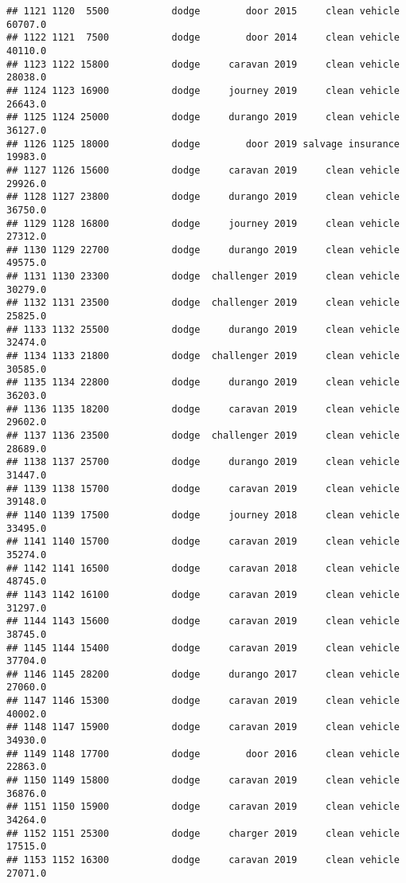 \documentclass[
]{article}
\begin{document}
\begin{verbatim}
## 1121 1120  5500           dodge        door 2015     clean vehicle   60707.0
## 1122 1121  7500           dodge        door 2014     clean vehicle   40110.0
## 1123 1122 15800           dodge     caravan 2019     clean vehicle   28038.0
## 1124 1123 16900           dodge     journey 2019     clean vehicle   26643.0
## 1125 1124 25000           dodge     durango 2019     clean vehicle   36127.0
## 1126 1125 18000           dodge        door 2019 salvage insurance   19983.0
## 1127 1126 15600           dodge     caravan 2019     clean vehicle   29926.0
## 1128 1127 23800           dodge     durango 2019     clean vehicle   36750.0
## 1129 1128 16800           dodge     journey 2019     clean vehicle   27312.0
## 1130 1129 22700           dodge     durango 2019     clean vehicle   49575.0
## 1131 1130 23300           dodge  challenger 2019     clean vehicle   30279.0
## 1132 1131 23500           dodge  challenger 2019     clean vehicle   25825.0
## 1133 1132 25500           dodge     durango 2019     clean vehicle   32474.0
## 1134 1133 21800           dodge  challenger 2019     clean vehicle   30585.0
## 1135 1134 22800           dodge     durango 2019     clean vehicle   36203.0
## 1136 1135 18200           dodge     caravan 2019     clean vehicle   29602.0
## 1137 1136 23500           dodge  challenger 2019     clean vehicle   28689.0
## 1138 1137 25700           dodge     durango 2019     clean vehicle   31447.0
## 1139 1138 15700           dodge     caravan 2019     clean vehicle   39148.0
## 1140 1139 17500           dodge     journey 2018     clean vehicle   33495.0
## 1141 1140 15700           dodge     caravan 2019     clean vehicle   35274.0
## 1142 1141 16500           dodge     caravan 2018     clean vehicle   48745.0
## 1143 1142 16100           dodge     caravan 2019     clean vehicle   31297.0
## 1144 1143 15600           dodge     caravan 2019     clean vehicle   38745.0
## 1145 1144 15400           dodge     caravan 2019     clean vehicle   37704.0
## 1146 1145 28200           dodge     durango 2017     clean vehicle   27060.0
## 1147 1146 15300           dodge     caravan 2019     clean vehicle   40002.0
## 1148 1147 15900           dodge     caravan 2019     clean vehicle   34930.0
## 1149 1148 17700           dodge        door 2016     clean vehicle   22863.0
## 1150 1149 15800           dodge     caravan 2019     clean vehicle   36876.0
## 1151 1150 15900           dodge     caravan 2019     clean vehicle   34264.0
## 1152 1151 25300           dodge     charger 2019     clean vehicle   17515.0
## 1153 1152 16300           dodge     caravan 2019     clean vehicle   27071.0

\end{verbatim}
\end{document}
